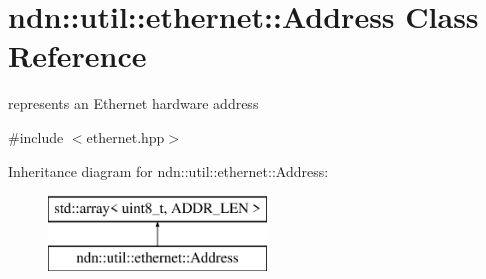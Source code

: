 \hypertarget{classndn_1_1util_1_1ethernet_1_1Address}{}\section{ndn\+:\+:util\+:\+:ethernet\+:\+:Address Class Reference}
\label{classndn_1_1util_1_1ethernet_1_1Address}


represents an Ethernet hardware address  




{\ttfamily \#include $<$ethernet.\+hpp$>$}

Inheritance diagram for ndn\+:\+:util\+:\+:ethernet\+:\+:Address\+:\begin{figure}[H]
\begin{center}
\leavevmode
\includegraphics[height=2.000000cm]{classndn_1_1util_1_1ethernet_1_1Address}
\end{center}
\end{figure}
